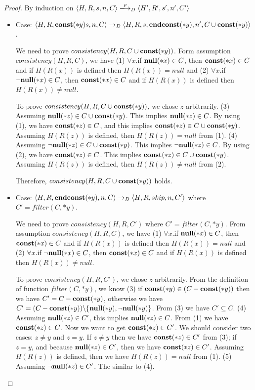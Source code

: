 \begin{proof}
  By induction on \(\langle H, R, s, n, C \rangle
  \xlongrightarrow{\rho}_D \langle H', R', s', n', C'\rangle \)
 \begin{itemize}
    
  \item Case: \(\langle H, R, \mathbf{const}(*y) s, n, C \rangle \rightarrow_D
    \langle H, R, s;\mathbf{endconst}(*y), n', C \cup {\mathbf{const}(*y)} \rangle \).

    We need to prove \(consistency(H, R, C \cup {\mathbf{const}(*y)})\). Form
    assumption \(consistency(H, R, C)\), we have (1) \(\forall x\).if
    \({\bf null}(*x) \in C\), then \(\mathbf{const}(*x) \in C\) and if \(H(R(x))\) is
    defined then \(H(R(x)) = null\) and (2) \(\forall x\).if
    \(\neg{\bf null}(*x) \in C\), then \(\mathbf{const}(*x) \in C\) and if \(H(R(x))\) is
    defined then \(H(R(x)) \ne null\).

    To prove \(consistency(H, R, C \cup {\mathbf{const}(*y)})\), we chose \(z\)
    arbitrarily. (3) Assuming \(\mathbf{null}(*z) \in C\cup{\mathbf{const}(*y)}\). This
    implies \(\mathbf{null}(*z) \in C\). By using (1), we have \(\mathbf{const}(*z) \in
    C\), and this implies \(\mathbf{const}(*z) \in C \cup
    \mathbf{const}(*y)\). Assuming \(H(R(z))\) is defined, then \(H(R(z)) =
    null\) from (1). (4) Assuming \(\neg\mathbf{null}(*z) \in C\cup{\mathbf{const}(*y)}\). This
    implies \(\neg\mathbf{null}(*z) \in C\). By using (2), we have \(\mathbf{const}(*z) \in
    C\). This implies \(\mathbf{const}(*z) \in C \cup
    \mathbf{const}(*y)\). Assuming \(H(R(z))\) is defined, then \(H(R(z)) \ne
    null\) from (2). 
    
    Therefore, \(consistency(H, R, C \cup {\mathbf{const}(*y)})\) holds.

\item Case: \(\langle H, R, \mathbf{endconst}(*y), n, C \rangle \rightarrow_D
    \langle H, R, skip, n, C'\rangle \) where \(C' = filter(C, *y)\).

    We need to prove \(consistency(H, R, C')\) where \(C' = filter(C,
    *y)\). From assumption \(consistency(H, R, C)\), we have (1)
    \(\forall x\).if \({\bf null}(*x) \in C\), then \(\mathbf{const}(*x) \in C\) and
    if \(H(R(x))\) is defined then \(H(R(x)) = null\) and (2)
    \(\forall x\).if \(\neg{\bf null}(*x) \in C\), then \(\mathbf{const}(*x) \in C\) and
    if \(H(R(x))\) is defined then \(H(R(x)) \ne null\).

    To prove \(consistency(H, R, C')\), we chose \(z\)
    arbitrarily. From the definition of function \(filter(C, *y)\), we
    know (3) if \(\mathbf{const}(*y) \in (C - \mathbf{const}(*y))\) then we have \(C' =
    C - \mathbf{const}(*y)\), otherwise we have \(C' = (C -
    \mathbf{const}(*y))\backslash\{\mathbf{null}(*y), \neg\mathbf{null}(*y)\}\). From (3) we have \(C'
    \subseteq C\). (4) Assuming \(\mathbf{null}(*z) \in C'\), this implies
    \(\mathbf{null}(*z) \in C\). From (1) we have \(\mathbf{const}(*z) \in C\). Now we
    want to get \(\mathbf{const}(*z) \in C'\). We should consider two cases:
    \(z \ne y\) and \(z = y\). If \(z \ne y\) then we have \(\mathbf{const}(*z)
    \in C'\) from (3); if \(z = y\), and because \(\mathbf{null}(*z) \in C'\),
    then we have \(\mathbf{const}(*z) \in C'\). Assuming \(H(R(z))\) is
    defined, then we have \(H(R(z)) = null\) from (1). (5) Assuming
    \(\neg\mathbf{null}(*z) \in C'\). The similar to (4).


\end{itemize}
\end{proof}
